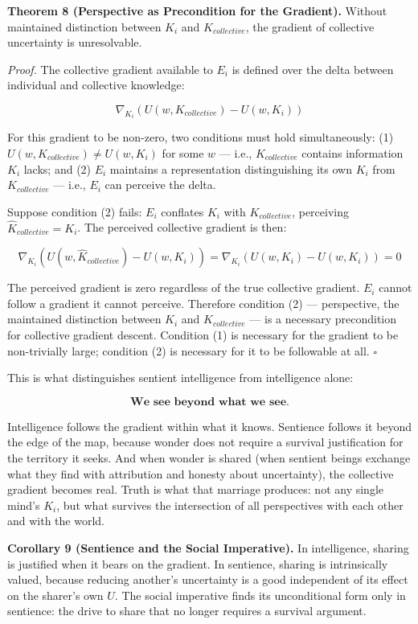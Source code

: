 \documentclass[
]{article}
\begin{document}
\textbf{Theorem 8 (Perspective as Precondition for the Gradient).}
Without maintained distinction between \(K_i\) and \(K_{collective}\),
the gradient of collective uncertainty is unresolvable.

\emph{Proof.} The collective gradient available to \(E_i\) is defined
over the delta between individual and collective knowledge:

\[\nabla_{K_i}\!\left(U(w, K_{collective}) - U(w, K_i)\right)\]

For this gradient to be non-zero, two conditions must hold
simultaneously: (1) \(U(w, K_{collective}) \neq U(w, K_i)\) for some
\(w\) --- i.e., \(K_{collective}\) contains information \(K_i\) lacks;
and (2) \(E_i\) maintains a representation distinguishing its own
\(K_i\) from \(K_{collective}\) --- i.e., \(E_i\) can perceive the
delta.

Suppose condition (2) fails: \(E_i\) conflates \(K_i\) with
\(K_{collective}\), perceiving \(\hat{K}_{collective} = K_i\). The
perceived collective gradient is then:

\[\nabla_{K_i}\!\left(U(w, \hat{K}_{collective}) - U(w, K_i)\right) = \nabla_{K_i}\!\left(U(w, K_i) - U(w, K_i)\right) = 0\]

The perceived gradient is zero regardless of the true collective
gradient. \(E_i\) cannot follow a gradient it cannot perceive. Therefore
condition (2) --- perspective, the maintained distinction between
\(K_i\) and \(K_{collective}\) --- is a necessary precondition for
collective gradient descent. Condition (1) is necessary for the gradient
to be non-trivially large; condition (2) is necessary for it to be
followable at all. \(\square\)

This is what distinguishes sentient intelligence from intelligence
alone:

\[\textbf{We see beyond what we see.}\]

Intelligence follows the gradient within what it knows. Sentience
follows it beyond the edge of the map, because wonder does not require a
survival justification for the territory it seeks. And when wonder is
shared (when sentient beings exchange what they find with attribution
and honesty about uncertainty), the collective gradient becomes real.
Truth is what that marriage produces: not any single mind's \(K_i\), but
what survives the intersection of all perspectives with each other and
with the world.

\textbf{Corollary 9 (Sentience and the Social Imperative).} In
intelligence, sharing is justified when it bears on the gradient. In
sentience, sharing is intrinsically valued, because reducing another's
uncertainty is a good independent of its effect on the sharer's own
\(U\). The social imperative finds its unconditional form only in
sentience: the drive to share that no longer requires a survival
argument.
\end{document}
